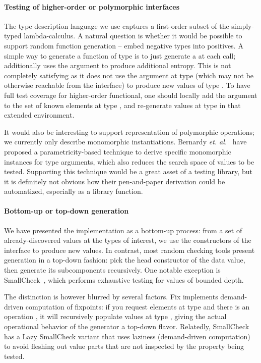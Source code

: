 \paragraph{Testing of higher-order or polymorphic interfaces}
\label{sec:higher-order}

The type description language we use captures a first-order subset of
the simply-typed lambda-calculus. A natural question is whether it
would be possible to support random function generation -- embed
negative types into positives. A simple way to generate a function of
type  is to just generate a  at each call;
\qcheck additionally uses the  argument to produce additional
entropy. This is not completely satisfying as it does not use the
argument at type  (which may not be otherwise reachable from
the interface) to produce new values of type . To have full
test coverage for higher-order functional, one should locally add the
argument to the set of known elements at type , and
re-generate values at type  in that extended environment.

It would also be interesting to support representation of polymorphic
operations; we currently only describe monomorphic
instantiations. Bernardy \emph{et. al.}~\cite{DBLP:conf/esop/BernardyJC10} have proposed
a parametricity-based technique to derive specific monomorphic
instances for type arguments, which also reduces the search space of
values to be tested. Supporting this technique would be a great asset
of a testing library, but it is definitely not obvious how their
pen-and-paper derivation could be automatized, especially as a library
function.

\paragraph{Bottom-up or top-down generation}

We have presented the  implementation as a bottom-up
process: from a set of already-discovered values at the types of
interest, we use the constructors of the interface to produce new
values. In contrast, most random checking tools present generation in
a top-down fashion: pick the head constructor of the data value, then
generate its subcomponents recursively. One notable exception is
SmallCheck~\cite{DBLP:conf/haskell/RuncimanNL08}, which performs
exhaustive testing for values of bounded depth.

The distinction is however blurred by several factors. Fix implements
demand-driven computation of fixpoints: if you request elements at
type  and there is an operation , it will
recursively populate values at type , giving the actual
operational behavior of the generator a top-down flavor. Relatedly,
SmallCheck has a Lazy SmallCheck variant that uses laziness
(demand-driven computation) to avoid fleshing out value parts that are
not inspected by the property being tested.

